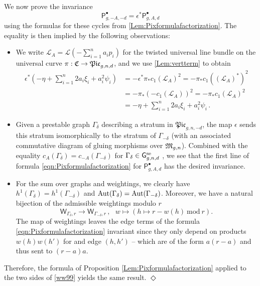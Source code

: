 \documentclass[a4paper,12pt]{article} %
\newcommand{\ca}[1]{{\mathcal{#1}}}
\def\P{\mathsf{P}}
\def\qed{{\hfill $\Diamond$}}
\def\Aut{{\rm Aut}}
\def\G{\mathsf{G}}
\theoremstyle{definition}
\theoremstyle{plain}%
\newcommand{\Picabs}{\mathfrak{Pic}}
\begin{document}
We now prove the invariance 
\begin{equation}\label{ww99}
\P_{g,-A,-d}^\bullet = \epsilon^*\P_{g,A,d}^\bullet
\end{equation}
using the formulas for these cycles from \cref{Lem:Pixformulafactorization}. The equality is then implied by the following observations:
\begin{itemize}
\item We write  $\ca L_A = \ca L(- \sum_{i=1}^n a_i p_i)$ for the twisted universal line bundle on the universal curve $\pi: \frak C \to \Picabs_{g,n,d}$, and we use \cref{Lem:vertterm} to obtain
\begin{align*}
    \epsilon^* \left(-\eta + \sum_{i=1}^n 2 a_i \xi_i+ a_i^2 \psi_i \right) &= - \epsilon^* \pi_* c_1(\mathcal{L}_A)^2 = - \pi_* c_1((\mathcal{L}_A)^*)^2\\ &= - \pi_* (-c_1(\mathcal{L}_A))^2= - \pi_* c_1(\mathcal{L}_A)^2\\
    &=-\eta + \sum_{i=1}^n 2 a_i \xi_i+ a_i^2 \psi_i\, .
\end{align*}
\item Given a prestable graph $\Gamma_\delta$ describing a stratum in $\Picabs_{g,n,-d}$, the map $\epsilon$ sends this stratum isomorphically to the stratum of $\Gamma_{-\delta}$ (with an associated commutative diagram of gluing morphisms over $\frak M_{g,n}$). Combined with the equality $c_A(\Gamma_\delta) = c_{-A}(\Gamma_{-\delta})$ for $\Gamma_\delta \in \G_{g,n,d}^\textup{se}$ , we see  that the first line of formula \eqref{eqn:Pixformulafactorization} for $\P_{g,A,d}^\bullet$ has the desired invariance.
\item For the sum over graphs and weightings, we clearly have $h^1(\Gamma_\delta) = h^1(\Gamma_{-\delta})$ and $\Aut(\Gamma_\delta)=\Aut(\Gamma_{-\delta})$. Moreover, we have a natural bijection of the admissible weightings modulo $r$
\[\mathsf{W}_{\Gamma_\delta,r} \to \mathsf{W}_{\Gamma_{-\delta},r}\, , \ \ \ w \mapsto (h \mapsto r-w(h) \ \text{mod}\ r).\]
The  map of weightings leaves the edge terms of the formula \eqref{eqn:Pixformulafactorization} invariant  since they only depend on products $w(h)w(h')$ for and edge $(h,h')$ --  which are of the form $a(r-a)$ and thus sent to $(r-a)a$.
\end{itemize}
Therefore, the formula of Proposition \ref{Lem:Pixformulafactorization} applied to 
the two sides of \eqref{ww99} yields the same result. \qed
\end{document}
